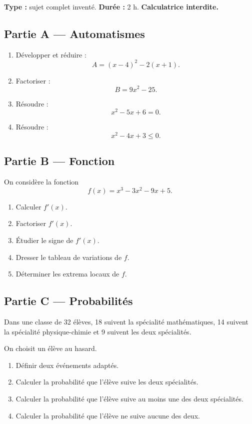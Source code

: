 \documentclass[11pt,a4paper]{article}
\begin{document}
\hypertarget{P-SUJET-01}{}
\begin{sujettype}
\textbf{Type :} sujet complet inventé.  
\textbf{Durée :} 2 h.  
\textbf{Calculatrice interdite.}

\subsection*{Partie A — Automatismes}

\begin{enumerate}
  \item Développer et réduire :
  \[
  A=(x-4)^2-2(x+1).
  \]
  \item Factoriser :
  \[
  B=9x^2-25.
  \]
  \item Résoudre :
  \[
  x^2-5x+6=0.
  \]
  \item Résoudre :
  \[
  x^2-4x+3\leq0.
  \]
\end{enumerate}

\subsection*{Partie B — Fonction}

On considère la fonction
\[
f(x)=x^3-3x^2-9x+5.
\]

\begin{enumerate}
  \item Calculer $f'(x)$.
  \item Factoriser $f'(x)$.
  \item Étudier le signe de $f'(x)$.
  \item Dresser le tableau de variations de $f$.
  \item Déterminer les extrema locaux de $f$.
\end{enumerate}

\subsection*{Partie C — Probabilités}

Dans une classe de 32 élèves, 18 suivent la spécialité mathématiques, 14 suivent la spécialité physique-chimie et 9 suivent les deux spécialités.

On choisit un élève au hasard.

\begin{enumerate}
  \item Définir deux événements adaptés.
  \item Calculer la probabilité que l'élève suive les deux spécialités.
  \item Calculer la probabilité que l'élève suive au moins une des deux spécialités.
  \item Calculer la probabilité que l'élève ne suive aucune des deux.
\end{enumerate}
\end{sujettype}
\end{document}
